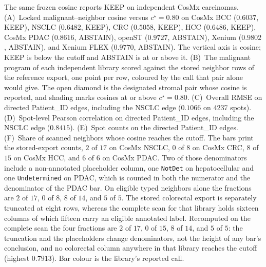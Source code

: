 The same frozen cosine reports KEEP on independent CosMx carcinomas. (A)~Locked malignant--neighbor cosine versus \(c^\star=0.80\) on CosMx BCC (\(0.6037\), KEEP), NSCLC (\(0.6482\), KEEP), CRC (\(0.5058\), KEEP), HCC (\(0.6486\), KEEP), CosMx PDAC (\(0.8616\), ABSTAIN), openST (\(0.9727\), ABSTAIN), Xenium (\(0.9802\), ABSTAIN), and Xenium FLEX (\(0.9770\), ABSTAIN). The vertical axis is cosine; KEEP is below the cutoff and ABSTAIN is at or above it. (B)~The malignant program of each independent library scored against the stored neighbor rows of the reference export, one point per row, coloured by the call that pair alone would give. The open diamond is the designated stromal pair whose cosine is reported, and shading marks cosines at or above \(c^\star=0.80\). (C)~Overall RMSE on directed Patient\_ID edges, including the NSCLC edge (\(0.1066\) on 4237 spots). (D)~Spot-level Pearson correlation on directed Patient\_ID edges, including the NSCLC edge (\(0.8415\)). (E)~Spot counts on the directed Patient\_ID edges. (F)~Share of scanned neighbors whose cosine reaches the cutoff. The bars print the stored-export counts, \(2\) of \(17\) on CosMx NSCLC, \(0\) of \(8\) on CosMx CRC, \(8\) of \(15\) on CosMx HCC, and \(6\) of \(6\) on CosMx PDAC. Two of those denominators include a non-annotated placeholder column, one \texttt{NotDet} on hepatocellular and one \texttt{Undetermined} on PDAC, which is counted in both the numerator and the denominator of the PDAC bar. On eligible typed neighbors alone the fractions are \(2\) of \(17\), \(0\) of \(8\), \(8\) of \(14\), and \(5\) of \(5\). The stored colorectal export is separately truncated at eight rows, whereas the complete scan for that library holds sixteen columns of which fifteen carry an eligible annotated label. Recomputed on the complete scan the four fractions are \(2\) of \(17\), \(0\) of \(15\), \(8\) of \(14\), and \(5\) of \(5\): the truncation and the placeholders change denominators, not the height of any bar's conclusion, and no colorectal column anywhere in that library reaches the cutoff (highest \(0.7913\)). Bar colour is the library's reported call.
